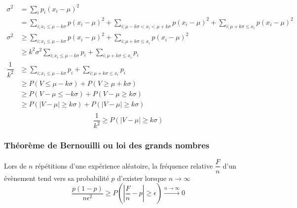 \begin{align*}
	\sigma^2 &= \sum_{i} p_i(x_i - \mu)^2\\
	         &= \sum_{i;x_i\leq\mu-k\sigma} p(x_i - \mu)^2 + \sum_{i;\mu-k\sigma < x_i < \mu+k\sigma} p(x_i - \mu)^2 + \sum_{i;\mu+k\sigma\leq x_i} p(x_i - \mu)^2\\
	\sigma^2 &\geq\sum_{i;x_i\leq\mu-k\sigma} p(x_i - \mu)^2 + \sum_{i;\mu+k\sigma\leq x_i} p(x_i - \mu)^2\\
	         &\geq k^2\sigma^2 \sum_{i;x_i\leq\mu-k\sigma} p_i + \sum_{i;\mu+k\sigma\leq x_i} p_i\\
	\dfrac{1}{k^2} &\geq \sum_{i;x_i\leq\mu-k\sigma} p_i + \sum_{i;\mu+k\sigma\leq x_i} p_i\\
	         &\geq P(V \leq \mu - k\sigma) + P(V \geq \mu +k\sigma)\\
	         &\geq P(V - \mu \leq - k\sigma) + P(V - \mu \geq k\sigma)\\
	         &\geq P(|V - \mu| \geq k\sigma) + P(|V - \mu| \geq k\sigma)\\
\end{align*}
$$\boxed{\dfrac{1}{k^2} \geq P(|V - \mu| \geq k\sigma)}$$








\newpage
\subsubsection{Théorème de Bernouilli ou loi des grands nombres}
Lors de $n$ répétitions d'une expérience aléatoire, la fréquence relative $\dfrac{F}{n}$ d'un évènement tend vers sa probabilité $p$ d'exister lorsque $n\rightarrow\infty$
$$\boxed{\dfrac{p(1-p)}{n\epsilon^2} \geq P\left(\left|\dfrac{F}{n}-p\right|\geq\epsilon\right) \stackrel{n\rightarrow\infty}{\rightarrow} 0}$$
